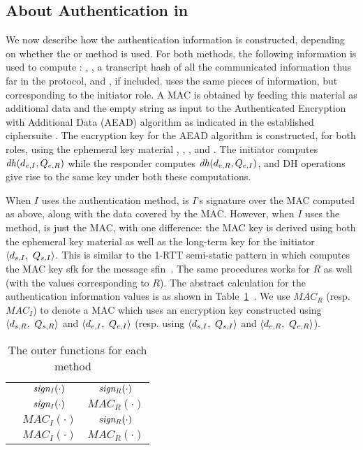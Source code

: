 \documentclass[runningheads]{llncs}
\begin{document}
\subsection{About Authentication in \mEdhoc{}}
\label{sec:edhocauth}
We now describe how the authentication information is constructed,
depending on whether the \mSig{} or \mStat{} method is used.
%
For both methods, the following information is used to compute
\mAuthr{}: \mIdcredr{}, \mCredr{}, a transcript hash of all the communicated
information thus far in the protocol, and \mADtwo{}, if included.
%
\mAuthi{} uses the same pieces of information, but corresponding to the
initiator role.
%
A MAC is obtained by feeding this material as additional data and the empty
string as input to the Authenticated Encryption with Additional Data (AEAD) algorithm as indicated in the established ciphersuite \mSuites{}.
%
The encryption key for the AEAD algorithm is constructed, for both roles,
using the ephemeral key material \mGx{}, \mGy{}, \mX{}, and \mY{}.
%
The initiator computes $\mathit{dh}(d_{e,I}, Q_{e,R})$ while the responder computes
$\mathit{dh}(d_{e,R}, Q_{e,I})$, and DH operations give rise to the same key under both
these computations.
%

When $I$ uses the \mSig{} authentication method, \mAuthi{} is $I$'s signature
over the MAC computed as above, along with the data covered by the MAC.
%
However, when $I$ uses the \mStat{} method, \mAuthi{} is just the MAC, with
one difference: the MAC key is derived using both the ephemeral key material
\mGxy{} as well as the long-term key for the initiator
$\langle\mPriv{I},\ \mPub{I}\rangle$.
%
This is similar to the 1-RTT semi-static pattern in \mOptls{} which computes the
MAC key \textsf{sfk} for the message
\textsf{sfin}~\cite{DBLP:conf/eurosp/KrawczykW16}.
%
The same procedures works for $R$ as well (with the values corresponding to
$R$).
%
The abstract calculation for the authentication information values is as shown
in Table~\ref{tab:authvalues}~\cite{Norr21}.
%
We use $\mathit{MAC}_{R}$ (resp. $\mathit{MAC}_{I}$) to denote a MAC
which uses
an encryption key constructed using
$\langle d_{s,R},\ Q_{s,R}\rangle$ and $\langle d_{e,I},\ Q_{e,I}\rangle$
(resp. using $\langle\mPriv{I},\ \mPub{I}\rangle$ and $\langle d_{e,R},\
Q_{e,R}\rangle$).
%
\begin{table}[ht]
\centering
\begin{tabular}{|c|c|c|}
        \hline
        \mMethod & \mAuthi & \mAuthr\\
        \hline
        \mSigSig{} & $\mathit{sign_{I}}(\cdot)$ & $\mathit{sign_{R}}(\cdot)$ \\
        \mSigStat{} & $\mathit{sign_{I}}(\cdot)$ & $\textit{MAC}_R(\cdot)$\\
        \mStatSig{} & $\textit{MAC}_I(\cdot)$ & $\mathit{sign_{R}}(\cdot)$\\
        \mStatStat{} & $\textit{MAC}_I(\cdot)$ & $\textit{MAC}_R(\cdot)$\\
        \hline
\end{tabular}
\caption{The outer functions for each method \mMethod{}~\cite{Norr21}}
\label{tab:authvalues}
\end{table}
%
\end{document}
